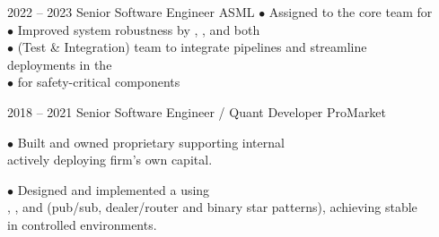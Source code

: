 \documentclass[9pt]{developercv} %
\newcommand{\myHilight}[2]{\tcbtp{\textit{\color{#1}{#2}}}}
\begin{document}
\begin{entrylist}
	\entry
		{2022 -- 2023}
		{Senior Software Engineer}
		{ASML}
		{
            $\bullet$ Assigned to the core \myHilight{textcolor}{Safety and Diagnostic} 
                      team for \myHilight{textcolor}{ASML's High-NA EUV lithography platform}\\
            $\bullet$ Improved system robustness by \myHilight{textcolor}{integrating}, 
                      \myHilight{textcolor}{refactoring}, and \myHilight{textcolor}{testing} 
                      both \myHilight{textcolor}{new and legacy code}\\
            $\bullet$ \myHilight{textcolor}{Collaborated with the T\&I} 
                      (Test \& Integration) team to integrate 
                      \myHilight{textcolor}{CI/CD} pipelines and streamline\\
                      \hspace*{0.7em}deployments in the \myHilight{textcolor}{way of working of the team}\\
            $\bullet$ \myHilight{textcolor}{Authored the software design documentation} 
                      for safety-critical components\\
        }

	\entry
	    {2018 -- 2021}
	    {Senior Software Engineer / Quant Developer}
	    {ProMarket}
        {
            $\bullet$ Built and owned proprietary \myHilight{textcolor}{FX trading infrastructure} 
                      supporting internal \myHilight{textcolor}{prop trading teams}\\
                      \hspace*{0.7em}actively deploying firm's own capital.
        
            $\bullet$ Designed and implemented a \myHilight{textcolor}{low-latency routing and 
                      messaging infrastructure} using\\
                      \hspace*{0.7em}\myHilight{textcolor}{C++17}, \myHilight{textcolor}{Python}, and 
                      \myHilight{textcolor}{ZeroMQ} (pub/sub, dealer/router and binary star patterns), 
                      achieving stable\\ 
                      \hspace*{0.7em}\myHilight{textcolor}{latencies of $150\sim250\mu$s} in 
                      controlled environments.
        
}
\end{entrylist}
\end{document}
